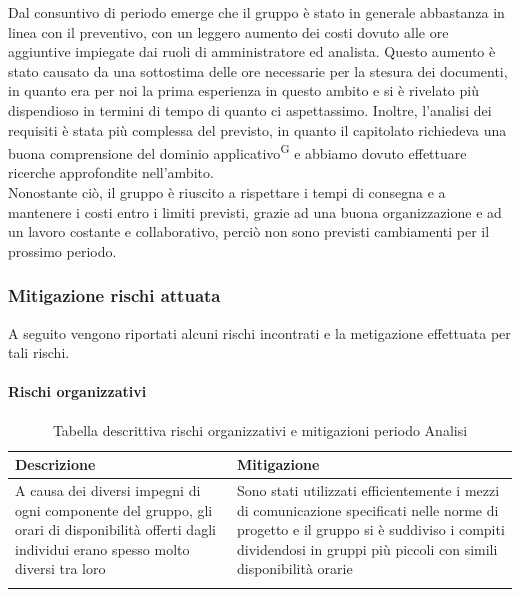 Dal consuntivo di periodo emerge che il gruppo è stato in generale abbastanza in linea con il preventivo,
 con un leggero aumento dei costi dovuto alle ore aggiuntive impiegate dai ruoli di amministratore ed analista.
Questo aumento è stato causato da una sottostima delle ore necessarie per la stesura dei documenti,
 in quanto era per noi la prima esperienza in questo ambito e si è rivelato più dispendioso in termini di tempo di quanto ci aspettassimo.
Inoltre, l'analisi dei requisiti è stata più complessa del previsto, in quanto il capitolato richiedeva una buona comprensione
 del dominio applicativo\textsuperscript{G} e abbiamo dovuto effettuare ricerche approfondite nell'ambito.\\
Nonostante ciò, il gruppo è riuscito a rispettare i tempi di consegna e a mantenere i costi entro i limiti previsti, grazie ad una buona organizzazione
 e ad un lavoro costante e collaborativo, perciò non sono previsti cambiamenti per il prossimo periodo.\\

\newpage
\subsubsection{Mitigazione rischi attuata}\label{sec:consuntivo:analisi:mitigazione}

A seguito vengono riportati alcuni rischi incontrati e la metigazione effettuata per tali rischi.\\

\paragraph{Rischi organizzativi}

\begin{center}


    \begin{xltabular}{\textwidth}{| X | X |}
                
        \textbf{\color{white} Descrizione} & \textbf{\color{white} Mitigazione}\\ 
        \endhead
    
        A causa dei diversi impegni di ogni componente del gruppo, gli orari di disponibilità offerti dagli individui erano spesso molto diversi tra loro &
        Sono stati utilizzati efficientemente i mezzi di comunicazione specificati nelle norme di progetto e il gruppo si è suddiviso i compiti dividendosi in gruppi più piccoli
        con simili disponibilità orarie \\
        \hline
            
        \caption{Tabella descrittiva rischi organizzativi e mitigazioni periodo Analisi}\label{tab:rischi_organizzativi_analisi}
    \end{xltabular}
\end{center}

